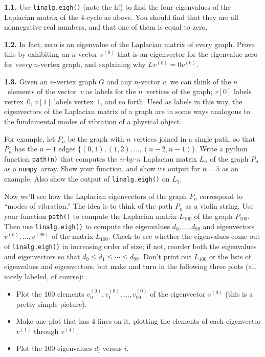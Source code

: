 \documentclass[11pt]{article}
\newcommand{\numpy}{{\tt numpy}}            %
\begin{document}
\par\medskip
{\bf 1.1.}
Use {\tt linalg.eigh()} (note the h!) to find the four eigenvalues of the 
Laplacian matrix of the 4-cycle as above.
You should find that they are all nonnegative real numbers,
and that one of them is equal to zero.

\par\medskip
{\bf 1.2.}
In fact, zero is an eigenvalue of the Laplacian matrix of every graph.
Prove this by exhibiting an $n$-vector $v^{(0)}$ that is an eigenvector 
for the eigenvalue zero for {\em every} $n$-vertex graph, 
and explaining why $Lv^{(0)} = 0v^{(0)}$.

\par\medskip
{\bf 1.3.} 
Given an $n$-vertex graph $G$ and any $n$-vector $v$, 
we can think of the $n$~elements of the vector~$v$ as labels for the 
$n$~vertices of the graph; 
$v[0]$ labels vertex~0, $v[1]$ labels vertex~1, and so forth.
Used as labels in this way,
the eigenvectors of the Laplacian matrix of a graph are in some ways
analogous to the fundamental modes of vibration of a physical object.

For example, let $P_n$ be the graph with $n$ vertices joined in a single path, 
so that $P_n$ has the $n-1$ edges $\{(0,1), (1,2), \ldots, (n-2, n-1)\}$.
Write a python function {\tt path(n)} that computes the $n$-by-$n$ Laplacian matrix
$L_n$ of the graph $P_n$ as a \numpy\ array.
Show your function, and show its output for $n=5$ as an example.
Also show the output of {\tt linalg.eigh()} on $L_5$.

Now we'll see how the Laplacian eigenvectors of the graph $P_n$ correspond 
to ``modes of vibration.'' 
The idea is to think of the path $P_n$ as a violin string.
Use your function {\tt path()} to compute the Laplacian matrix $L_{100}$ of 
the graph $P_{100}$. 
Then use {\tt linalg.eigh()} to compute the eigenvalues $d_0,\ldots,d_{99}$
and eigenvectors $v^{(0)},\ldots,v^{(99)}$ of the matrix $L_{100}$.
Check to see whether the eigenvalues come out of {\tt linalg.eigh()} in
increasing order of size; 
if not, reorder both the eigenvalues and eigenvectors so that
$d_0 \le d_1 \le \cdots \le d_{99}$.
Don't print out $L_{100}$ or the lists of eigenvalues and eigenvectors, 
but make and turn in the following three plots (all nicely labeled, of course):
\begin{itemize}
\item Plot the 100 elements $v^{(0)}_0, v^{(0)}_1, \ldots, v^{(0)}_{99}$
      of the eigenvector $v^{(0)}$ (this is a pretty simple picture).
\item Make one plot that has 4 lines on it, plotting the elements of 
      each eigenvector $v^{(1)}$ through $v^{(4)}$.
\item Plot the 100 eigenvalues $d_i$ versus $i$.
\end{itemize}
\end{document}
